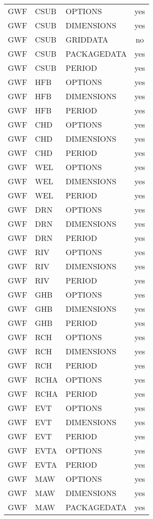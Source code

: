 \begin{longtable}{p{1.5cm} p{1.5cm} p{3cm} c}
\hline
GWF & CSUB & OPTIONS & yes \\ 
GWF & CSUB & DIMENSIONS & yes \\ 
GWF & CSUB & GRIDDATA & no \\ 
GWF & CSUB & PACKAGEDATA & yes \\ 
GWF & CSUB & PERIOD & yes \\ 
\hline
GWF & HFB & OPTIONS & yes \\ 
GWF & HFB & DIMENSIONS & yes \\ 
GWF & HFB & PERIOD & yes \\ 
\hline
GWF & CHD & OPTIONS & yes \\ 
GWF & CHD & DIMENSIONS & yes \\ 
GWF & CHD & PERIOD & yes \\ 
\hline
GWF & WEL & OPTIONS & yes \\ 
GWF & WEL & DIMENSIONS & yes \\ 
GWF & WEL & PERIOD & yes \\ 
\hline
GWF & DRN & OPTIONS & yes \\ 
GWF & DRN & DIMENSIONS & yes \\ 
GWF & DRN & PERIOD & yes \\ 
\hline
GWF & RIV & OPTIONS & yes \\ 
GWF & RIV & DIMENSIONS & yes \\ 
GWF & RIV & PERIOD & yes \\ 
\hline
GWF & GHB & OPTIONS & yes \\ 
GWF & GHB & DIMENSIONS & yes \\ 
GWF & GHB & PERIOD & yes \\ 
\hline
GWF & RCH & OPTIONS & yes \\ 
GWF & RCH & DIMENSIONS & yes \\ 
GWF & RCH & PERIOD & yes \\ 
\hline
GWF & RCHA & OPTIONS & yes \\ 
GWF & RCHA & PERIOD & yes \\ 
\hline
GWF & EVT & OPTIONS & yes \\ 
GWF & EVT & DIMENSIONS & yes \\ 
GWF & EVT & PERIOD & yes \\ 
\hline
GWF & EVTA & OPTIONS & yes \\ 
GWF & EVTA & PERIOD & yes \\ 
\hline
GWF & MAW & OPTIONS & yes \\ 
GWF & MAW & DIMENSIONS & yes \\ 
GWF & MAW & PACKAGEDATA & yes \\ 

\end{longtable}
